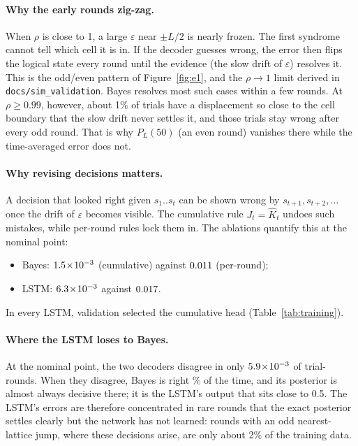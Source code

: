 \paragraph{Why the early rounds zig-zag.}
When $\rho$ is close to 1, a large $\varepsilon$ near $\pm L/2$ is nearly
frozen. The first syndrome cannot tell which cell it is in. If the decoder
guesses wrong, the error then flips the logical state every round until the
evidence (the slow drift of $\varepsilon$) resolves it. This is the odd/even
pattern of Figure~\ref{fig:e1}, and the $\rho\to1$ limit derived in
\texttt{docs/sim\_validation}. Bayes resolves most such cases within a few
rounds. At $\rho\ge0.99$, however, about 1\% of trials have a displacement so
close to the cell boundary that the slow drift never settles it, and those
trials stay wrong after every odd round. That is why $P_L(50)$ (an even round)
vanishes there while the time-averaged error does not.

\paragraph{Why revising decisions matters.}
A decision that looked right given $s_1..s_t$ can be shown wrong by
$s_{t+1},s_{t+2},\dots$ once the drift of $\varepsilon$ becomes visible. The
cumulative rule $J_t=\hat K_t$ undoes such mistakes, while per-round rules
lock them in. The ablations quantify this at the nominal point:
\begin{itemize}
  \item Bayes: $1.5\!\times\!10^{-3}$ (cumulative) against $0.011$ (per-round);
  \item LSTM: $6.3\!\times\!10^{-3}$ against $0.017$.
\end{itemize}
In every LSTM, validation selected the cumulative head
(Table~\ref{tab:training}).

\paragraph{Where the LSTM loses to Bayes.}
At the nominal point, the two decoders disagree in only $5.9\!\times\!10^{-3}$ of
trial-rounds. When they disagree, Bayes is right \EdiagBayesRight\% of the
time, and its posterior is almost always decisive there; it is the LSTM's
output that sits close to 0.5. The LSTM's errors are therefore concentrated
in rare rounds that the exact posterior settles clearly but the network has
not learned: rounds with an odd nearest-lattice jump, where these decisions
arise, are only about 2\% of the training data.

